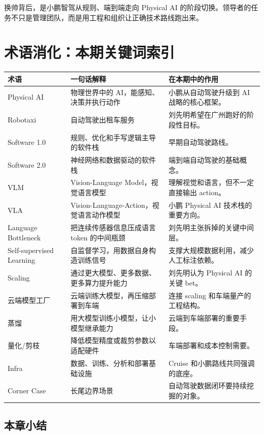 \documentclass[a4paper]{article}
\begin{document}
换帅背后，是小鹏智驾从规则、端到端走向 Physical AI 的阶段切换。领导者的任务不只是管理团队，而是用工程和组织让正确技术路线跑出来。

\section{术语消化：本期关键词索引}

\begin{longtable}{p{}p{}p{}}
\toprule
术语 & 一句话解释 & 在本期中的作用 \\
\midrule
Physical AI & 物理世界中的 AI，能感知、决策并执行动作 & 小鹏从自动驾驶升级到 AI 战略的核心框架。 \\
Robotaxi & 自动驾驶出租车服务 & 刘先明希望在广州跑好的阶段性目标。 \\
Software 1.0 & 规则、优化和手写逻辑主导的软件栈 & 早期自动驾驶路线。 \\
Software 2.0 & 神经网络和数据驱动的软件栈 & 端到端自动驾驶的基础概念。 \\
VLM & Vision-Language Model，视觉语言模型 & 理解视觉和语言，但不一定直接输出 action。 \\
VLA & Vision-Language-Action，视觉语言动作模型 & 小鹏 Physical AI 技术栈的重要方向。 \\
Language Bottleneck & 把连续传感器信息压成语言 token 的中间瓶颈 & 刘先明主张拆掉的关键中间层。 \\
Self-supervised Learning & 自监督学习，用数据自身构造训练信号 & 支撑大规模数据利用，减少人工标注依赖。 \\
Scaling & 通过更大模型、更多数据、更多算力提升能力 & 刘先明认为 Physical AI 的关键 bet。 \\
云端模型工厂 & 云端训练大模型，再压缩部署到车端 & 连接 scaling 和车端量产的工程结构。 \\
蒸馏 & 用大模型训练小模型，让小模型继承能力 & 云端到车端部署的重要手段。 \\
量化/剪枝 & 降低模型精度或裁剪参数以适配硬件 & 车端部署和成本控制需要。 \\
Infra & 数据、训练、分析和部署基础设施 & Cruise 和小鹏路线共同强调的底座。 \\
Corner Case & 长尾边界场景 & 自动驾驶数据闭环要持续挖掘的对象。 \\
\bottomrule
\end{longtable}

\subsection{本章小结}
\end{document}
